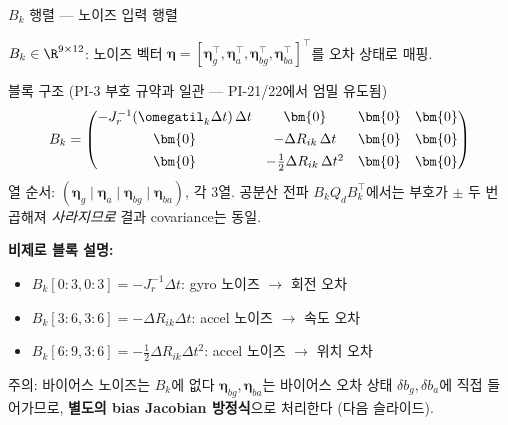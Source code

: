 \begin{frame}[shrink=10]{$B_k$ 행렬 — 노이즈 입력 행렬}

  $B_k \in \R^{9\times 12}$: 노이즈 벡터 $\bm{\eta} = [\bm{\eta}_g^\top, \bm{\eta}_a^\top, \bm{\eta}_{bg}^\top, \bm{\eta}_{ba}^\top]^\top$를 오차 상태로 매핑.

  \pause
  \begin{block}{블록 구조 (PI-3 부호 규약과 일관 — PI-21/22에서 엄밀 유도됨)}
    \[
      B_k =
      \begin{pmatrix}
        -J_r^{-1}(\omegatil_k\Delta t)\,\Delta t & \bm{0}                        & \bm{0} & \bm{0} \\[4pt]
        \bm{0}                                   & -\Delta R_{ik}\,\Delta t      & \bm{0} & \bm{0} \\[4pt]
        \bm{0}                                   & -\tfrac{1}{2}\Delta R_{ik}\,\Delta t^2 & \bm{0} & \bm{0}
      \end{pmatrix}
    \]
    열 순서: $(\bm{\eta}_g \mid \bm{\eta}_a \mid \bm{\eta}_{bg} \mid \bm{\eta}_{ba})$, 각 3열.
    공분산 전파 $B_k Q_d B_k^\top$에서는 부호가 $\pm$ 두 번 곱해져 \emph{사라지므로} 결과 covariance는 동일.
  \end{block}

  \pause
  \vspace{0.3em}
  \textbf{비제로 블록 설명:}
  \begin{itemize}
    \item $B_k[0\!:\!3, 0\!:\!3] = -J_r^{-1}\Delta t$:
          gyro 노이즈 $\to$ 회전 오차
    \item $B_k[3\!:\!6, 3\!:\!6] = -\Delta R_{ik}\Delta t$:
          accel 노이즈 $\to$ 속도 오차
    \item $B_k[6\!:\!9, 3\!:\!6] = -\tfrac{1}{2}\Delta R_{ik}\Delta t^2$:
          accel 노이즈 $\to$ 위치 오차
  \end{itemize}

  \pause
  \begin{alertblock}{주의: 바이어스 노이즈는 $B_k$에 없다}
    $\bm{\eta}_{bg}, \bm{\eta}_{ba}$는 바이어스 오차 상태 $\delta b_g, \delta b_a$에 직접 들어가므로,
    \textbf{별도의 bias Jacobian 방정식}으로 처리한다 (다음 슬라이드).
  \end{alertblock}
\end{frame}


